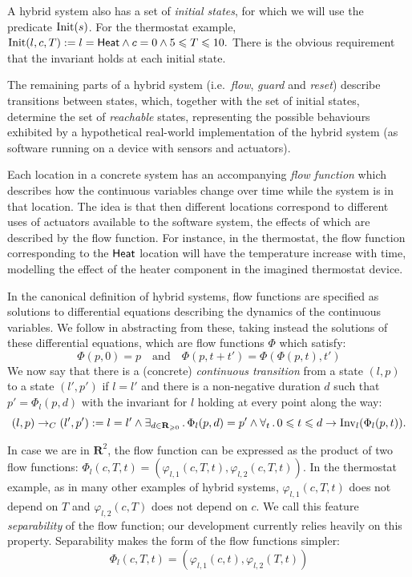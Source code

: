 \documentclass[runningheads]{llncs}
\renewcommand{\leq}{\leqslant}
\renewcommand{\geq}{\geqslant}
\newcommand{\Exists}[2]{\exists_{#1} \, . \, #2}
\newcommand{\Forall}[2]{\forall_{#1} \, . \, #2}
\def\phi{\varphi}
\newcommand{\IR}{{\mathbf R}}
\newcommand{\Heat}{{\sf Heat}}
\newcommand{\Inv}{{\rm Inv}}
\newcommand{\Init}{{\rm Init}}
\newcommand{\contrans}{\rightarrow_C}
\newcommand{\Dur}{{\IR_{\geq 0}}}
\begin{document}
A hybrid system also has a set of \emph{initial states}, for which we
will use the predicate $\Init(s)$.  For the thermostat example,
$\Init(l,c,T) := l= \Heat \wedge c= 0 \wedge 5 \leq T \leq 10.$
There is the obvious requirement that the invariant holds at each
initial state.


The remaining parts of a hybrid system (i.e.\ {\em flow}, {\em guard}
and {\em reset}) describe transitions between states, which, together
with the set of initial states, determine the set of \emph{reachable}
states, representing the possible behaviours exhibited by a
hypothetical real-world implementation of the hybrid system (as
software running on a device with sensors and actuators).

Each location in a concrete system has an accompanying \emph{flow
  function} which describes how the continuous variables change over
time while the system is in that location. The idea is that then
different locations correspond to different uses of actuators
available to the software system, the effects of which are described
by the flow function. For instance, in the thermostat, the flow
function corresponding to the $\Heat$ location will have the
temperature increase with time, modelling the effect of the heater
component in the imagined thermostat device.

In the canonical definition of hybrid systems, flow functions are
specified as solutions to differential equations describing the
dynamics of the continuous variables. We follow \cite{alur} in
abstracting from these, taking instead the solutions of these
differential equations, which are flow functions $\Phi$ which satisfy:
$$\Phi( p, 0) = p \quad \mbox{and} \quad \Phi (p, t + t') = \Phi (\Phi( p, t), t')$$
We now say that there is a (concrete) \emph{continuous transition}
from a state $(l, p)$ to a state $(l', p')$ if $l = l'$ and there is a
non-negative duration $d$ such that $p' = \Phi_l( p,d)$ with the
invariant for $l$ holding at every point along the way:
$$ (l,p) \contrans (l',p') := l=l' \wedge \Exists{d\in
\Dur}{\Phi_l(p, d) = p' \wedge \Forall{t}{0 \leq t\leq d \rightarrow
\Inv_l(\Phi_l (p, t))}}.$$

In case we are in $\IR ^2$, the flow function can be expressed as the
product of two flow functions: $\Phi_l(c,T,t) = (\phi_{l,1}(c,T,t),
\phi_{l,2}(c,T,t))$. In the thermostat example, as in many other
examples of hybrid systems, $\phi_{l,1}(c,T,t)$ does not depend on $T$
and $\phi_{l,2}(c,T)$ does not depend on $c$. We call this feature
{\em separability\/} of the flow function; our development currently
relies heavily on this property. Separability makes the form of the
flow functions simpler:
$$\Phi_l(c,T,t) = (\phi_{l,1}(c,t), \phi_{l,2}(T,t))$$
\end{document}
